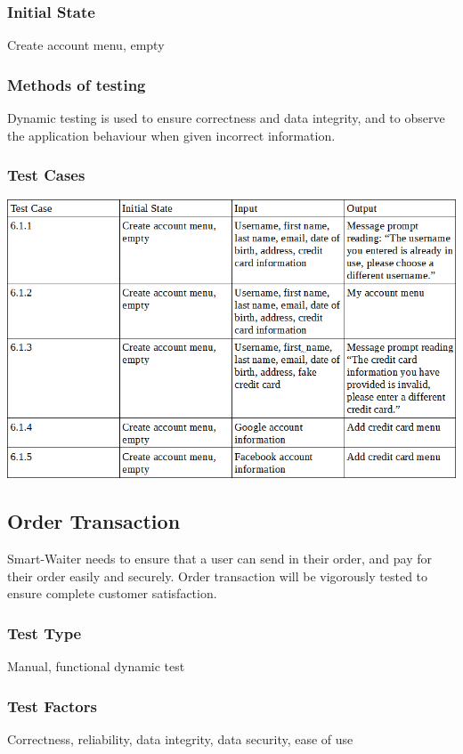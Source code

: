 \documentclass[12pt]{article}
\begin{document}
\subsubsection{Initial State}
Create account menu, empty
\subsubsection{Methods of testing}
Dynamic testing is used to ensure correctness and data integrity, and to observe the application behaviour when given incorrect information.
\subsubsection{Test Cases}
\includegraphics[width=\textwidth,height=\textheight,keepaspectratio]{accountTC.png}


\subsection{Order Transaction}
Smart-Waiter needs to ensure that a user can send in their order, and pay for their order easily and securely. Order transaction will be vigorously tested to ensure complete customer satisfaction.  
\subsubsection{Test Type}
Manual, functional dynamic test 
\subsubsection{Test Factors}
Correctness, reliability, data integrity, data security, ease of use
\end{document}
